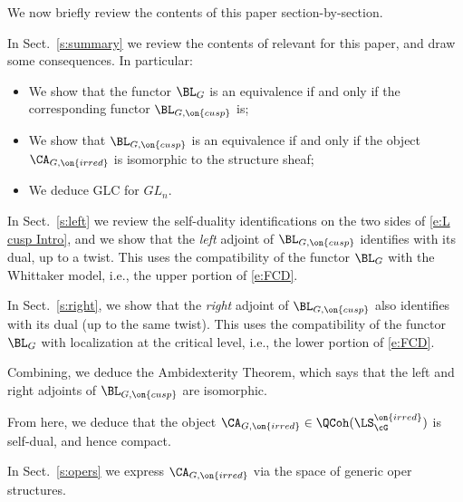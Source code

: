 \documentclass[9pt]{amsart}
\theoremstyle{remark}
\theoremstyle{definition}
\theoremstyle{remark}
\newcommand{\secref}[1]{Sect.~\ref{#1}}
\numberwithin{equation}{section}
\begin{document}

We now briefly review the contents of this paper section-by-section.

\sssec{}

In \secref{s:summary} we review the contents of \cite{GLC1,GLC2,GLC3} relevant for this paper, and 
draw some consequences. In particular:

\begin{itemize}

\item We show that the functor $\BL_G$ is an equivalence if and only if the corresponding functor $\BL_{G,\on{cusp}}$ is;

\item We show that $\BL_{G,\on{cusp}}$ is an equivalence if and only if the object $\CA_{G,\on{irred}}$ is isomorphic
to the structure sheaf;

\smallskip

\item We deduce GLC for $GL_n$.

\end{itemize}

\sssec{}

In \secref{s:left} we review the self-duality identifications on the two sides of \eqref{e:L cusp Intro}, and we show that
the \emph{left} adjoint of $\BL_{G,\on{cusp}}$ identifies with its dual, up to a twist. This uses the compatibility of the functor $\BL_G$ with the
Whittaker model, i.e., the upper portion of \eqref{e:FCD}. 

\medskip

In \secref{s:right}, we show that the \emph{right} adjoint of $\BL_{G,\on{cusp}}$ also identifies with its dual (up to the
same twist). This uses the compatibility of the functor $\BL_G$ with localization at the critical level, i.e., the lower portion of \eqref{e:FCD}. 

\medskip

Combining, we deduce the Ambidexterity Theorem, which says that the left and right adjoints of $\BL_{G,\on{cusp}}$ are isomorphic.

\medskip

From here, we deduce that the object $\CA_{G,\on{irred}}\in \QCoh(\LS^{\on{irred}}_\cG)$ is self-dual, and hence
compact.

\sssec{}

In \secref{s:opers} we express $\CA_{G,\on{irred}}$ via the space of generic oper structures. 

\medskip
\end{document}
